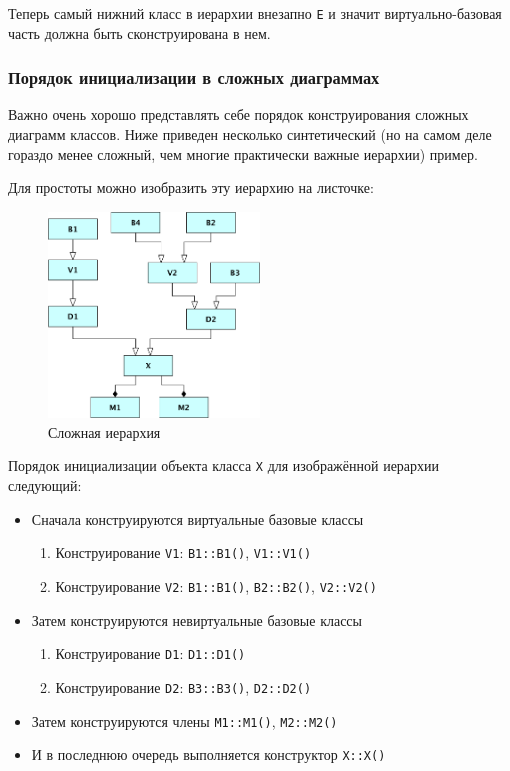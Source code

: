 \documentclass[a4paper,12pt,oneside]{article}
\begin{document}
Теперь самый нижний класс в иерархии внезапно \lstinline!E! и значит виртуально-базовая часть должна быть сконструирована в нем.

\subsubsection{Порядок инициализации в сложных диаграммах}\label{InitOrder}

Важно очень хорошо представлять себе порядок конструирования сложных диаграмм классов. Ниже приведен несколько синтетический (но на самом деле гораздо менее сложный, чем многие практически важные иерархии) пример.



Для простоты можно изобразить эту иерархию на листочке:

\begin{figure}[h!]
\centering
\includegraphics[width=0.5\textwidth]{illustrations/complexhier-crop.pdf}
\caption{Сложная иерархия}
\label{fig:complexhier-crop}
\end{figure}

Порядок инициализации объекта класса \lstinline!X! для изображённой иерархии следующий:

\begin{itemize}
\item Сначала конструируются виртуальные базовые классы
  \begin{enumerate}
  \item Конструирование \lstinline!V1!: \lstinline!B1::B1()!, \lstinline!V1::V1()!
  \item Конструирование \lstinline!V2!: \lstinline!B1::B1()!, \lstinline!B2::B2()!, \lstinline!V2::V2()!
  \end{enumerate}
\item Затем конструируются невиртуальные базовые классы
  \begin{enumerate}
  \item Конструирование \lstinline!D1!: \lstinline!D1::D1()!
  \item Конструирование \lstinline!D2!: \lstinline!B3::B3()!, \lstinline!D2::D2()!
  \end{enumerate}
\item Затем конструируются члены \lstinline!M1::M1()!, \lstinline!M2::M2()!
\item И в последнюю очередь выполняется конструктор \lstinline!X::X()!
\end{itemize}
\end{document}
